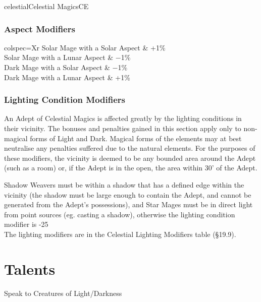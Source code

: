 \begin{College}[1.3]{celestial}{Celestial Magics}{CE}
\subsubsection{Aspect Modifiers}

\begin{dqtblr}{colspec={Xr}}
Solar Mage with a Solar Aspect	& +1\% \\
Solar Mage with a Lunar Aspect	& −1\% \\
Dark Mage with a Solar Aspect	& −1\% \\
Dark Mage with a Lunar Aspect	& +1\% \\
\end{dqtblr}

\subsubsection{Lighting Condition Modifiers}

An Adept of Celestial Magics is affected greatly by the lighting
conditions in their vicinity.  The bonuses and penalties gained in
this section apply only to non-magical forms of Light and Dark.
Magical forms of the elements may at best neutralise any penalties
suffered due to the natural elements.  For the purposes of these
modifiers, the vicinity is deemed to be any bounded area around the
Adept (such as a room) or, if the Adept is in the open, the area
within 30’ of the Adept.

Shadow Weavers must be within a shadow that has a defined edge within
the vicinity (the shadow must be large enough to contain the Adept,
and cannot be generated from the Adept’s possessions), and Star Mages
must be in direct light from point sources (eg. casting a shadow),
otherwise the lighting condition modifier is -25\\%

The lighting modifiers are in the Celestial Lighting Modifiers table
(§19.9).


\section{Talents}

\begin{talent}[T-1]{Speak to Creatures of Light/Darkness}


\end{talent}
\end{College}
